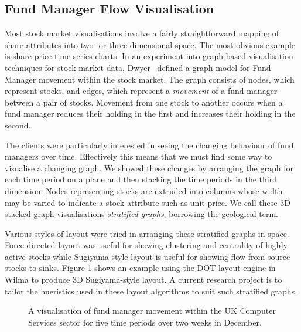 \documentclass[runningheads]{cl2emult}
\begin{document}
\subsection{Fund Manager Flow Visualisation} \label{sec:fmflow}
Most stock market visualisations involve a fairly straightforward
mapping of share attributes into two- or three-dimensional space.  The most
obvious example is share price time series charts.  In an experiment
into graph based visualisation techniques for stock market data,
Dwyer~\cite{dwyer02fmflow} defined a graph model for Fund Manager
movement within the stock market.  The graph consists of nodes,
which represent stocks, and edges, which represent a {\em movement} of a
fund manager between a pair of stocks.  Movement from one stock to
another occurs when a fund manager reduces their holding in the first
and increases their holding in the second.

The clients were particularly interested in seeing the changing
behaviour of fund managers over time.  Effectively this means that we
must find some way to visualise a changing graph.  We showed these changes by
arranging the graph for each time period on a plane and then stacking
the time periods in the third dimension.  Nodes representing stocks
are extruded into columns whose width may be varied to indicate a
stock attribute such as unit price.  We call these 3D stacked graph
visualisations {\em stratified graphs}, borrowing the geological term.

Various styles of layout were tried in arranging these stratified
graphs in space.  Force-directed layout was useful for showing clustering and centrality of
highly active stocks while Sugiyama-style layout is useful for showing
flow from source stocks to sinks.  Figure \ref{fig-fm} shows an
example using the DOT layout engine in Wilma to produce 3D Sugiyama-style layout.  A current research project is to tailor the hueristics
used in these layout algorithms to suit such stratified graphs.

\begin{figure}[h]
  \centering
  \caption{A visualisation of fund manager movement within the UK
  Computer Services sector for five time periods over two weeks in December.}
  \label{fig-fm}
\end{figure}
\end{document}
